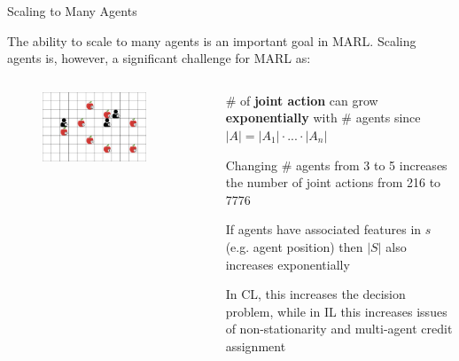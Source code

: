 \begin{frame}{Scaling to Many Agents}

The ability to scale to many agents is an important goal in MARL. Scaling agents is, however, a significant challenge for MARL as:

\begin{columns}
    \begin{column}{0.4\textwidth}
        \begin{figure}
        \centering
        \includegraphics[width=0.8\textwidth, height = 0.8\textheight, keepaspectratio]{images/environments/lbf/foraging_8x12_b.png}
        \end{figure}
    \end{column}
    \begin{column}{0.6\textwidth}
    \blist
        \item \# of \textbf{joint action} can grow \textbf{exponentially} with \# agents since $|A| = |A_1| \cdot ... \cdot |A_n|$
        \item Changing \# agents from 3 to 5 increases the number of joint actions from 216 to 7776
        \item If agents have associated features in $s$ (e.g. agent position) then $|S|$ also increases exponentially
        \item In CL, this increases the decision problem, while in IL this increases issues of non-stationarity and multi-agent credit assignment
    \elist
    \end{column}
\end{columns}

\end{frame}

